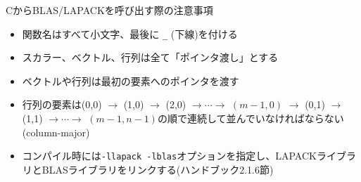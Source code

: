 \begin{frame}[t,fragile]{CからBLAS/LAPACKを呼び出す際の注意事項}
  \begin{itemize}
  \item 関数名はすべて小文字、最後に \verb+_+ (下線)を付ける
  \item スカラー、ベクトル、行列は全て「ポインタ渡し」とする
  \item ベクトルや行列は最初の要素へのポインタを渡す
  \item 行列の要素は(0,0) $\rightarrow$ (1,0) $\rightarrow$ (2,0) $\rightarrow\cdots\rightarrow$ $(m-1,0)$ $\rightarrow$ (0,1) $\rightarrow$ (1,1) $\rightarrow\cdots\rightarrow$ $(m-1,n-1)$の順で連続して並んでいなければならない(column-major)
  \item コンパイル時には{\tt -llapack -lblas}オプションを指定し、LAPACKライブラリとBLASライブラリをリンクする(ハンドブック2.1.6節)
  \end{itemize}
\end{frame}
